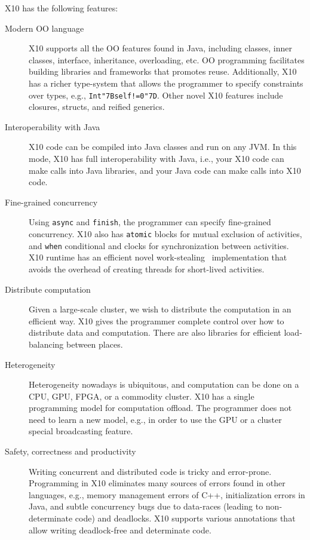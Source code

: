 \documentclass[a4paper]{article}
\def\codesmaller{\small}
\newcommand{\code}[1]{\texttt{\textup{\codesmaller #1}}}
\newcommand{\ttlcb}{\texttt{\char "7B}}
\newcommand{\ttrcb}{\texttt{\char "7D}}
\newcommand{\lb}{\ttlcb}
\newcommand{\rb}{\ttrcb}
\begin{document}
X10 has the following features:
\begin{description}
  \item[Modern OO language]
    X10 supports all the OO features found in Java,
        including classes, inner classes, interface, inheritance, overloading, etc.
    OO programming facilitates building libraries and frameworks that promotes reuse.
    Additionally, X10 has a richer type-system that allows the programmer
        to specify constraints over types, e.g., \code{Int\lb{}self!=0\rb{}}.
    Other novel X10 features include closures, structs, and reified generics.
  \item[Interoperability with Java]
    X10 code can be compiled into Java classes and run on any JVM.
    In this mode, X10 has full interoperability with Java,
        i.e., your X10 code can make calls into Java libraries,
        and your Java code can make calls into X10 code.
  \item[Fine-grained concurrency]
    Using \code{async} and \code{finish}, the programmer can specify
        fine-grained concurrency.
    X10 also has \code{atomic} blocks for mutual exclusion of activities,
        and \code{when} conditional and clocks for synchronization between activities.
    X10 runtime has an efficient novel work-stealing~\cite{} implementation
        that avoids the overhead of creating threads for short-lived activities.
  \item[Distribute computation]
    Given a large-scale cluster, we wish to distribute the computation in an efficient way.
    X10 gives the programmer complete control over how to distribute data and computation.
    There are also libraries for efficient load-balancing between places.
  \item[Heterogeneity]
    Heterogeneity nowadays is ubiquitous, and computation can be done on a CPU, GPU, FPGA, or a commodity cluster.
    X10 has a single programming model for computation offload.
    The programmer does not need to learn a new model, e.g., in order to use the GPU or
        a cluster special broadcasting feature.
  \item[Safety, correctness and productivity]
    Writing concurrent and distributed code is tricky and error-prone.
    Programming in X10 eliminates many sources of errors found in other languages,
        e.g., memory management errors of C++, initialization errors in Java,
        and subtle concurrency bugs due to data-races (leading to non-determinate code)
        and deadlocks.
    X10 supports various annotations that allow writing deadlock-free and determinate code.
\end{description}
\end{document}
